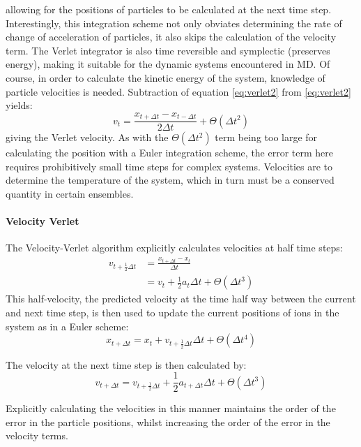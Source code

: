 \noindent allowing for the positions of particles to be calculated at the next time step.
Interestingly, this integration scheme not only obviates determining the rate of change of acceleration of particles, it also skips the calculation of the velocity term.
The Verlet integrator is also time reversible and symplectic (preserves energy), making it suitable for the dynamic systems encountered in MD.
Of course, in order to calculate the kinetic energy of the system, knowledge of particle velocities is needed.
Subtraction of equation \ref{eq:verlet2} from \ref{eq:verlet2} yields:
\begin{equation}
	v_{t} = \frac{x_{t+\Delta t} - x_{t-\Delta t}}{2\Delta t} + \Theta(\Delta t^2)
\end{equation}
giving the Verlet velocity.
As with the $\Theta(\Delta t^2)$ term being too large for calculating the position with a Euler integration scheme, the error term here requires prohibitively small time steps for complex systems.
Velocities are to determine the temperature of the system, which in turn must be a conserved quantity in certain ensembles. %

\paragraph{Velocity Verlet} The Velocity-Verlet algorithm explicitly calculates velocities at half time steps:
\begin{align}
	v_{t +\frac{1}{2}\Delta t} &= \frac{x_{t+\Delta t} - x_t}{\Delta t}\\[10pt]
	&= v_t + \frac{1}{2}a_t\Delta t + \Theta(\Delta t^3)
\end{align}
This half-velocity, the predicted velocity at the time half way between the current and next time step, is then used to update the current positions of ions in the system as in a Euler scheme:
\begin{equation}
	x_{t+\Delta t} = x_t + v_{t +\frac{1}{2}\Delta t}\Delta t + \Theta(\Delta t^4)
\end{equation}

\noindent The velocity at the next time step is then calculated by:
\begin{equation}
	v_{t + \Delta t} = v_{t +\frac{1}{2}\Delta t} + \frac{1}{2}a_{t+\Delta t}\Delta t + \Theta(\Delta t^3)
\end{equation}

\noindent Explicitly calculating the velocities in this manner maintains the order of the error in the particle positions, whilst increasing the order of the error in the velocity terms.


